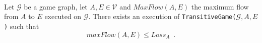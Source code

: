 \begin{lemma} \ \\
   \label{maxflowgame}
   Let $\mathcal{G}$ be a game graph, let $A, E \in \mathcal{V}$ and $MaxFlow\left(A, E\right)$ the maximum flow from
   $A$ to $E$ executed on $\mathcal{G}$. There exists an execution of
   \texttt{TransitiveGame(}$\mathcal{G}, A, E$\texttt{)} such that
   \begin{equation*}
      maxFlow\left(A, E\right) \leq Loss_A \enspace.
   \end{equation*}
\end{lemma}
